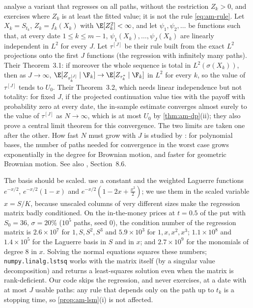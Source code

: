 \begin{remark}[Convergence]\label{rem:am-clp}
\textcite{clement-lamberton-protter} analyse a variant that regresses on all paths, without
the restriction $Z_k>0$, and exercises where $Z_k$ is at least the fitted value; it is not
the rule \eqref{eq:am-rule}. Let $X_k=S_{t_k}$, $Z_k=f_k(X_k)$ with $\E[Z_k^2]<\infty$, and let
$\psi_1,\psi_2,\dots$ be functions such that, at every date $1\le k\le m-1$,
$\psi_1(X_k),\dots,\psi_J(X_k)$ are linearly independent in $L^2$ for every $J$. Let
$\tau^{[J]}$ be their rule built from the exact $L^2$ projections onto the first $J$
functions (the regression with infinitely many paths). Their Theorem~3.1: if moreover the
whole sequence is total in $L^2(\sigma(X_k))$, then as $J\to\infty$,
$\E[Z_{\tau^{[J]}_k}\mid\F_k]\to\E[Z_{\tau^*_k}\mid\F_k]$ in $L^2$ for every $k$, so the value
of $\tau^{[J]}$ tends to $U_0$. Their Theorem~3.2, which needs linear independence but not
totality: for fixed $J$, if the projected continuation value ties with the payoff with
probability zero at every date, the in-sample estimate converges almost surely to the value
of $\tau^{[J]}$ as $N\to\infty$, which is at most $U_0$ by \cref{thm:am-dp}(ii); they also
prove a central limit theorem for this convergence. The two limits are taken one after the other. How fast $N$ must grow with $J$
is studied by \textcite{glasserman-yu}: for polynomial bases, the number of paths needed
for convergence in the worst case grows exponentially in the degree for Brownian motion, and
faster for geometric Brownian motion. See also \textcite{glasserman-mc}, Section~8.6.
\end{remark}

\begin{remark}\label{rem:am-basis}
The basis should be scaled. \textcite{longstaff-schwartz} use a constant and the weighted
Laguerre functions $e^{-x/2}$, $e^{-x/2}(1-x)$ and $e^{-x/2}(1-2x+\frac{x^2}2)$; we use them
in the scaled variable $x=S/K$, because unscaled columns of very different sizes make the
regression matrix badly conditioned. On the
in-the-money prices at $t=0.5$ of the put with $S_0=36$, $\sigma=20\%$ ($10^5$ paths, seed
$0$), the condition number of the regression matrix is $2.6\times10^7$ for $1,S,S^2,S^3$ and
$5.9\times10^3$ for $1,x,x^2,x^3$; $1.1\times10^8$ and $1.4\times10^5$ for the Laguerre basis
in $S$ and in $x$; and $2.7\times10^9$ for the monomials of degree $8$ in $x$. Solving the
normal equations squares these numbers; \texttt{numpy.linalg.lstsq} works with the matrix
itself (by a singular value decomposition) and returns a least-squares solution even when
the matrix is rank-deficient. Our code skips the regression, and never exercises, at a date
with at most $J$ usable paths: any rule that depends only on the path up to $t_k$ is a
stopping time, so \cref{prop:am-lsm}(i) is not affected.
\end{remark}

